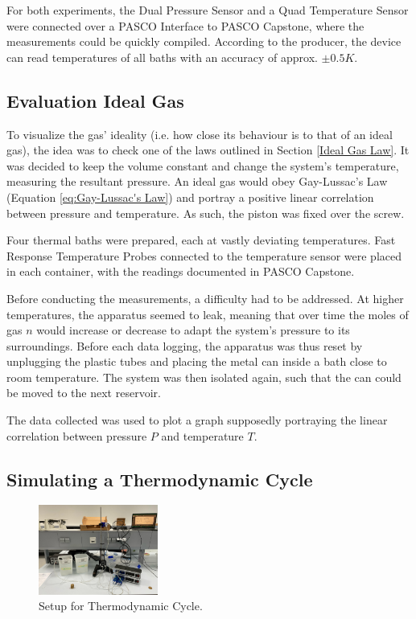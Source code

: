 For both experiments, the Dual Pressure Sensor and a Quad Temperature Sensor were connected over a PASCO Interface to PASCO Capstone, where the measurements could be quickly compiled. According to the producer, the device can read temperatures of all baths with an accuracy of approx. $\mathit{\pm 0.5 K}$.


\subsection{Evaluation Ideal Gas}
\label{Evaluation Ideal Gas}

To visualize the gas' ideality (i.e. how close its behaviour is to that of an ideal gas), the idea was to check one of the laws outlined in Section \ref{Ideal Gas Law}. It was decided to keep the volume constant and change the system's temperature, measuring the resultant pressure. An ideal gas would obey Gay-Lussac's Law (Equation \ref{eq:Gay-Lussac's Law}) and portray a positive linear correlation between pressure and temperature. As such, the piston was fixed over the screw.

Four thermal baths were prepared, each at vastly deviating temperatures. Fast Response Temperature Probes connected to the temperature sensor were placed in each container, with the readings documented in PASCO Capstone. 

Before conducting the measurements, a difficulty had to be addressed. At higher temperatures, the apparatus seemed to leak, meaning that over time the moles of gas $\mathit{n}$ would increase or decrease to adapt the system's pressure to its surroundings. Before each data logging, the apparatus was thus reset by unplugging the plastic tubes and placing the metal can inside a bath close to room temperature. The system was then isolated again, such that the can could be moved to the next reservoir. 

The data collected was used to plot a graph supposedly portraying the linear correlation between pressure $\mathit{P}$ and temperature $\mathit{T}$. 

\subsection{Simulating a Thermodynamic Cycle}
\label{Therm Cycle}

\begin{figure}  %
    \centering
    \includegraphics[width=0.35\textwidth]{Graphics/Cycle_Setup.jpeg}  %
    \caption{Setup for Thermodynamic Cycle.}
    \label{fig:Cycle_Setup}
\end{figure}


